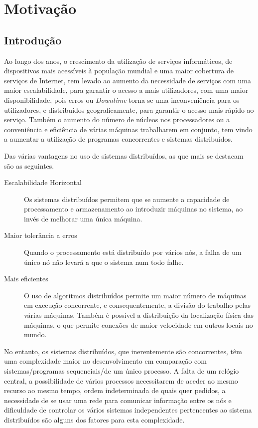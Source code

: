 \chapter{Motivação}
\label{chap:motivacao}

\section{Introdução}
\label{motivacao:sec:introducao}



Ao longo dos anos, o crescimento da utilização de serviços informáticos, de dispositivos mais acessíveis à população mundial e uma maior cobertura de serviços de Internet, 
tem levado ao aumento da necessidade de serviços com uma maior escalabilidade, para garantir o acesso a mais utilizadores, com uma maior disponibilidade, pois erros ou \emph{Downtime} torna-se uma inconveniência para os utilizadores,
e distribuídos geograficamente, para garantir o acesso mais rápido ao serviço.
Também o aumento do número de núcleos nos processadores ou a conveniência e eficiência de várias máquinas trabalharem em conjunto, tem vindo a aumentar a utilização de programas concorrentes e sistemas distribuídos.

Das várias vantagens no uso de sistemas distribuídos, as que mais se destacam são as seguintes.
\begin{description}
    \item [Escalabilidade Horizontal] Os sistemas distribuídos permitem que se aumente a capacidade de processamento e armazenamento ao introduzir máquinas no sistema, ao invés de melhorar uma única máquina.
	
    \item [Maior tolerância a erros]Quando o processamento está distribuído por vários nós, a falha de um único nó não levará a que o sistema num todo falhe.

    \item [Mais eficientes] O uso de algoritmos distribuídos permite um maior número de máquinas em execução concorrente, e consequentemente, a divisão do trabalho pelas várias máquinas.
	Também é possível a distribuição da localização física das máquinas, o que permite conexões de maior velocidade em outros locais no mundo.

\end{description}

No entanto, os sistemas distribuídos, que inerentemente são concorrentes, têm uma complexidade maior no desenvolvimento em comparação com sistemas/programas sequenciais/de um único processo.
A falta de um relógio central, a possibilidade de vários processos necessitarem de aceder ao mesmo recurso ao mesmo tempo, ordem indeterminada de quais quer pedidos, a necessidade de se usar uma rede para comunicar informação entre os nós e dificuldade de controlar os vários sistemas independentes pertencentes ao sistema distribuídos são alguns dos fatores para esta complexidade.

